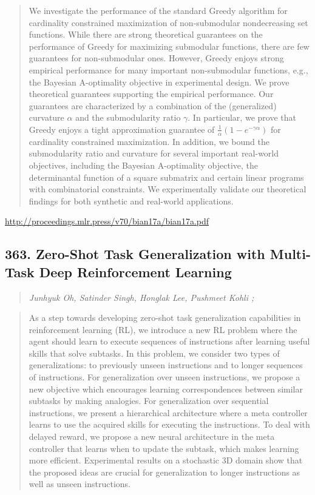 \documentclass{article}
\begin{document}
\begin{quote}
    We investigate the performance of the standard Greedy algorithm for cardinality constrained maximization of non-submodular nondecreasing set functions. While there are strong theoretical guarantees on the performance of Greedy for maximizing submodular functions, there are few guarantees for non-submodular ones. However, Greedy enjoys strong empirical performance for many important non-submodular functions, e.g., the Bayesian A-optimality objective in experimental design. We prove theoretical guarantees supporting the empirical performance. Our guarantees are characterized by a combination of the (generalized) curvature $\alpha$ and the submodularity ratio $\gamma$. In particular, we prove that Greedy enjoys a tight approximation guarantee of $\frac{1}{\alpha}(1- e^{-\gamma\alpha})$ for cardinality constrained maximization. In addition, we bound the submodularity ratio and curvature for several important real-world objectives, including the Bayesian A-optimality objective, the determinantal function of a square submatrix and certain linear programs with combinatorial constraints. We experimentally validate our theoretical findings for both synthetic and real-world applications.  
\end{quote}

\href{http://proceedings.mlr.press/v70/bian17a/bian17a.pdf}{http://proceedings.mlr.press/v70/bian17a/bian17a.pdf}

\subsection{363. Zero-Shot Task Generalization with Multi-Task Deep Reinforcement Learning}

\begin{quote}
\footnotesize{\textit{Junhyuk Oh, Satinder Singh, Honglak Lee, Pushmeet Kohli ;}}

\end{quote}

\begin{quote}
    As a step towards developing zero-shot task generalization capabilities in reinforcement learning (RL), we introduce a new RL problem where the agent should learn to execute sequences of instructions after learning useful skills that solve subtasks. In this problem, we consider two types of generalizations: to previously unseen instructions and to longer sequences of instructions. For generalization over unseen instructions, we propose a new objective which encourages learning correspondences between similar subtasks by making analogies. For generalization over sequential instructions, we present a hierarchical architecture where a meta controller learns to use the acquired skills for executing the instructions. To deal with delayed reward, we propose a new neural architecture in the meta controller that learns when to update the subtask, which makes learning more efficient. Experimental results on a stochastic 3D domain show that the proposed ideas are crucial for generalization to longer instructions as well as unseen instructions.  
\end{quote}
\end{document}
